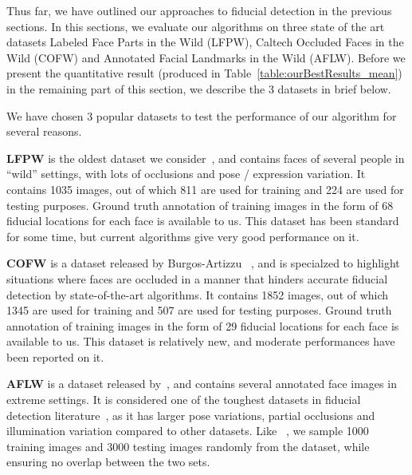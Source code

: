 \label{sec:basic_algorithm}

Thus far, we have outlined our approaches to fiducial detection in the previous sections.
In this sections, we evaluate our algorithms on three state of the art datasets
Labeled Face Parts in the Wild (LFPW), Caltech Occluded Faces in the Wild (COFW) and Annotated Facial Landmarks in the Wild (AFLW). Before we present the quantitative result (produced in Table~\ref{table:ourBestResults_mean}) in the remaining
part of this section, we describe the 3 datasets in brief below. 
 
 

We have chosen 3 popular datasets to test the performance of our algorithm for several reasons.

\textbf{LFPW}
is the oldest dataset we consider~\cite{kumarPAMI13_faceExem}, and contains faces of several people in ``wild'' settings,
with lots of occlusions and pose / expression variation. It contains 1035 images, out of which
811 are used for training and 224 are used for testing purposes. Ground truth annotation of
training images in the form of 68 fiducial locations for each face is available to us. This dataset
has been standard for some time, but current algorithms give very good performance 
on it.

\textbf{COFW}
is a dataset released by Burgos-Artizzu \etal~\cite{artizzzuICCV13_COFW}, and is
specialzed to highlight situations where faces are occluded in a manner
that hinders accurate fiducial detection by state-of-the-art algorithms.
It contains 1852 images, out of which
1345 are used for training and 507 are used for testing purposes. Ground truth annotation of
training images in the form of 29 fiducial locations for each face is available to us. This dataset
is relatively new, and moderate performances have been reported on it.

\textbf{AFLW}
is a dataset released by~\cite{koetsingerBFIAT11_AFLW}, and contains several annotated face images
in extreme settings. It is considered one of the toughest datasets in fiducial detection
literature~\cite{smithECCV14_ED,zhangECCV14_deepfacealign}, as it has larger pose variations, 
partial occlusions and illumination variation compared to other datasets. Like
~\cite{zhangECCV14_deepfacealign}, we sample 1000 training images and 3000 testing images
randomly from the dataset, while ensuring no overlap between the two sets.

